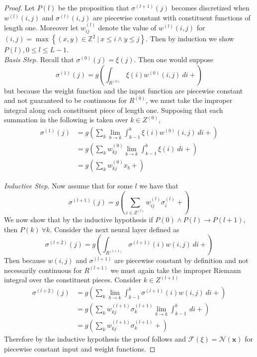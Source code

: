 \documentclass{article}
\begin{document}
\begin{proof}
Let $P(l)$ be the proposition that $\sigma^{(l+1)}(j)$ becomes discretized when $w^{(l)}(i,j)$ and $\sigma^{(l)}(i,j)$ are piecewise constant with constituent functions of length one. Moreover let $w_{ij}^{(l)}$ denote the value of $w^{(l)}(i,j)$ for $(i,j) = \max\left\{(x,y) \in \mathbb{Z}^2\ |\ x\leq i \wedge y \leq j\right\}$. Then by induction we show $P(l), 0 \leq l \leq L-1$. \\


\textit{Basis Step.} Recall that $\sigma^{(0)}(j) = \xi(j)$. Then one would suppose
\begin{equation}\sigma^{(1)}(j) = g\left(\int_{R^{(0)}} \xi(i) w^{(0)}(i,j)\ di +  \right)\end{equation}
but because the weight function and the input function are piecewise constant and not guaranteed to be continuous for $R^{(0)}$, we must take the improper integral along each constituent piece of length one. Supposing that each summation in the following is taken over $k\in Z^{(0)}$,
\begin{equation}
\begin{aligned}
    \sigma^{(1)}(j) &= g\left(\sum_{k}\lim_{b\to k}\int_{k-1}^b\xi(i) w^{(0)}(i,j)\ di +  \right) \\
    &= g\left(\sum_{k}w^{(0)}_{kj}\lim_{b\to k}\int_{k-1}^b\xi(i)\ di +  \right) \\
        &= g\left(\sum_{k}w_{kj}^{(0)}x_b +  \right)
 \end{aligned}
 \end{equation}
 
 
\textit{Inductive Step.} Now assume that for some $l$ we have that
\begin{equation}\sigma^{(l+1)}(j) = g\left(\sum_{i\in Z^{(l)}}w_{ij}^{(l)}\sigma_i^{(l)} +   \right)\end{equation}
We now show that by the inductive hypothesis if $P(0) \wedge P(l) \to P(l+1)$, then $P(k)\  \forall k$. Consider the next neural layer defined as
\begin{equation}\sigma^{(l+2)}(j) = g\left(\int_{R^{(l+1)}}\sigma^{(l+1)}(i) w(i,j)\ di +  \right)\end{equation}
Then because $w(i,j)$ and $\sigma^{(l+1)}$ are piecewise constant by definition and not necessarily continuous for $R^{(l+1)}$ we must again take the improper Riemann integral over the constituent pieces. Consider $k\in Z^{(l+1)}$
\begin{equation}
    \begin{aligned}
        \sigma^{(l+2)}(j) &= g\left(\sum_{k}\lim_{b\to k}\int_{k-1}^b\sigma^{(l+1)}(i) w(i,j)\ di +  \right) \\
                                          &= g\left(\sum_{k}w_{kj}^{(l+1)}\sigma_k^{(l+1)}\lim_{b\to k}\int_{k-1}^b\ di +  \right) \\
                                          &= g\left(\sum_{k}w_{kj}^{(l+1)}\sigma_k^{(l+1)} +  \right)
    \end{aligned}
\end{equation}
Therefore by the inductive hypothesis the proof follows and $\mathcal{F}(\xi) = \mathcal{N}(\pmb{x})$ for piecewise constant input and weight functions.


\end{proof}
\end{document}
